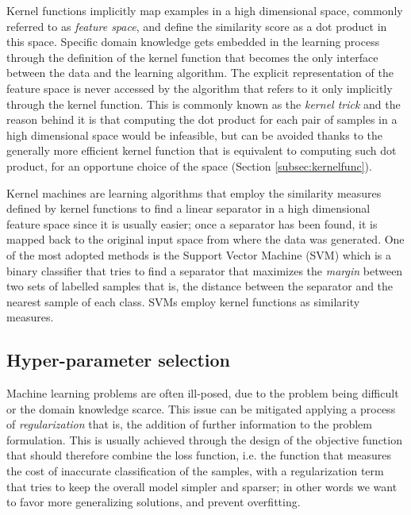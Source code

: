 Kernel functions implicitly map examples in a high dimensional space, commonly
referred to as \emph{feature space}, and define the similarity score as a dot
product in this space.
Specific domain knowledge gets embedded in the learning process through the definition
of the kernel function that becomes the only interface between the data
and the learning algorithm.
The explicit representation of the feature space is never accessed by the algorithm
that refers to it only implicitly through the kernel function.
This is commonly known as the \emph{kernel trick} and the reason behind it is 
that computing the dot product for each pair of samples in a high dimensional space
would be infeasible, but can be avoided thanks to the generally more efficient
kernel function that is equivalent to computing such dot product, for an opportune
choice of the space (Section \ref{subsec:kernelfunc}).

Kernel machines are learning algorithms that employ the similarity measures defined
by kernel functions to find a linear separator in a high dimensional feature space
since it is usually easier; once a separator has been found, it is mapped back
to the original input space from where the data was generated.
One of the most adopted methods is the Support Vector Machine (SVM) \cite{Cortes&Vapnik:1995}
which is a binary classifier that tries to find a separator that maximizes the \emph{margin}
between two sets of labelled samples that is, the distance between the separator and the
nearest sample of each class.
SVMs employ kernel functions as similarity measures.

\subsection{Hyper-parameter selection}
\label{subsec:hyper1}

Machine learning problems are often ill-posed, due to the problem being difficult or
the domain knowledge scarce.
This issue can be mitigated applying a process of \emph{regularization} that is,
the addition of further information to the problem formulation.
This is usually achieved through the design of the objective function that should
therefore combine the loss function, i.e. the function that measures the cost of
inaccurate classification of the samples, with a regularization term that tries
to keep the overall model simpler and sparser; in other words we want to
favor more generalizing solutions, and prevent overfitting.

